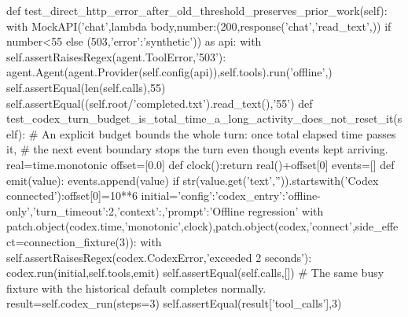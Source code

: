     def test_direct_http_error_after_old_threshold_preserves_prior_work(self):
        with MockAPI('chat',lambda body,number:(200,response('chat','read_text',{})) if number<55 else (503,{'error':'synthetic'})) as api:
            with self.assertRaisesRegex(agent.ToolError,'503'):
                agent.Agent(agent.Provider(self.config(api)),self.tools).run('offline',{})
            self.assertEqual(len(self.calls),55)
            self.assertEqual((self.root/'completed.txt').read_text(),'55')
    def test_codex_turn_budget_is_total_time_a_long_activity_does_not_reset_it(self):
        # An explicit budget bounds the whole turn: once total elapsed time passes it,
        # the next event boundary stops the turn even though events kept arriving.
        real=time.monotonic
        offset=[0.0]
        def clock():return real()+offset[0]
        events=[]
        def emit(value):
            events.append(value)
            if str(value.get('text','')).startswith('Codex connected'):offset[0]=10**6
        initial={'config':{'codex_entry':'offline-only','turn_timeout':2},'context':{},'prompt':'Offline regression'}
        with patch.object(codex.time,'monotonic',clock),patch.object(codex,'connect',side_effect=connection_fixture(3)):
            with self.assertRaisesRegex(codex.CodexError,'exceeded 2 seconds'):
                codex.run(initial,self.tools,emit)
        self.assertEqual(self.calls,[])
        # The same busy fixture with the historical default completes normally.
        result=self.codex_run(steps=3)
        self.assertEqual(result['tool_calls'],3)

